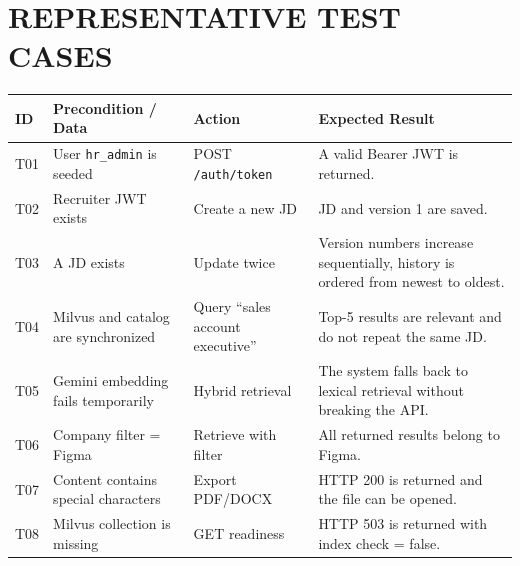 \documentclass[12pt,a4paper,oneside]{report}
\newcommand{\code}[1]{\texttt{#1}}
\begin{document}
\chapter{REPRESENTATIVE TEST CASES}
\begin{longtable}{p{1.3cm}p{4.8cm}p{5.2cm}p{3.3cm}}
\toprule
\textbf{ID} & \textbf{Precondition / Data} & \textbf{Action} & \textbf{Expected Result}\\
\midrule
T01 & User \code{hr\_admin} is seeded & POST \code{/auth/token} & A valid Bearer JWT is returned.\\
T02 & Recruiter JWT exists & Create a new JD & JD and version 1 are saved.\\
T03 & A JD exists & Update twice & Version numbers increase sequentially, history is ordered from newest to oldest.\\
T04 & Milvus and catalog are synchronized & Query ``sales account executive'' & Top-5 results are relevant and do not repeat the same JD.\\
T05 & Gemini embedding fails temporarily & Hybrid retrieval & The system falls back to lexical retrieval without breaking the API.\\
T06 & Company filter = Figma & Retrieve with filter & All returned results belong to Figma.\\
T07 & Content contains special characters & Export PDF/DOCX & HTTP 200 is returned and the file can be opened.\\
T08 & Milvus collection is missing & GET readiness & HTTP 503 is returned with index check = false.\\
\bottomrule
\end{longtable}
\end{document}
